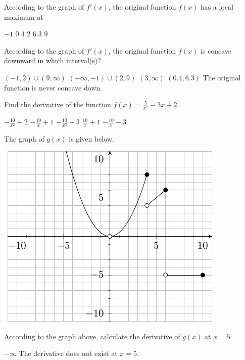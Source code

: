 \documentclass[11pt]{article}
\begin{document}
\begin{questions}
\begin{multiplechoice}{5}

\question According to the graph of $f'(x)$, the original function $f(x)$ has a local maximum at
\begin{answers}{3}
\ans $-1$
\ans $0.4$
\ans $2$
\ans $6.3$
\ans $9$
\end{answers}


\question According to the graph of $f'(x)$, the original function $f(x)$ is concave downward in which interval(s)?
\begin{answers}{3}
\ans $(-1,2) \cup (9, \infty)$
\ans $(-\infty, -1) \cup (2,9)$
\ans $(3, \infty)$
\ans $(0.4,6.3)$
\ans The original function is never concave down.
\end{answers}


\question Find the derivative of the function $f(x) = \frac{5}{x^2} - 3x + 2$.
\begin{answers}{2}
\ans $-\frac{10}{x^2} + 2$
\ans $-\frac{10}{x} + 1$
\ans $-\frac{10}{x^3} -3$
\ans $\frac{10}{x} +1$
\ans $-\frac{10}{x} - 3$
\end{answers}

\newpage

The graph of $g(x)$ is given below.\\

\begin{minipage}{\linewidth}%
\centering
\makebox[\linewidth]{}
\includegraphics{exam2graph2.pdf}
\label{graph2exam1}%
\end{minipage}
\question According to the graph above, calculate the derivative of $g(x)$ at $x = 5$
\begin{answers}{2}
\ans $-\infty$
\ans The derivative does not exist at $x=5$.
\end{answers}


\end{multiplechoice}
\end{questions}
\end{document}
